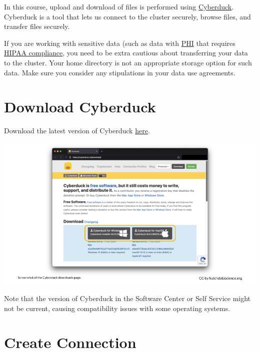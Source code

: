 \documentclass[
]{book}
\begin{document}
In this course, upload and download of files is performed using \href{https://cyberduck.io/}{Cyberduck}. Cyberduck is a tool that lets us connect to the cluster securely, browse files, and transfer files securely.

If you are working with sensitive data (such as data with \href{https://www.hhs.gov/answers/hipaa/what-is-phi/index.html}{PHI} that requires \href{https://www.hhs.gov/hipaa/index.html}{HIPAA compliance}, you need to be extra cautious about transferring your data to the cluster. Your home directory is not an appropriate storage option for such data. Make sure you consider any stipulations in your data use agreements.

\hypertarget{download-cyberduck}{%
\section{Download Cyberduck}\label{download-cyberduck}}

Download the latest version of Cyberduck \href{https://cyberduck.io/download/}{here}.

\begin{center}\includegraphics[width=1\linewidth]{resources/images/08-upload-download_files/figure-latex//1BQxrVYdKZTbpCaF-i_q9w7s9x034lEXpQZDU-Sl09cs_g16e400fe3e8_0_0} \end{center}

Note that the version of Cyberduck in the Software Center or Self Service might not be current, causing compatibility issues with some operating systems.

\hypertarget{create-connection}{%
\section{Create Connection}\label{create-connection}}
\end{document}
